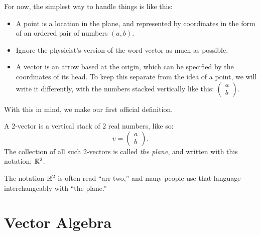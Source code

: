 \documentclass[00-livre-main.tex]{subfiles}
\begin{document}
For now, the simplest way to handle things is like this:
\begin{itemize}
\item A point is a location in the plane, and represented by coordinates in the form of an ordered pair of numbers $(a,b)$.
\item Ignore the physicist's version of the word vector as much as possible.
\item A vector is an arrow based at the origin, which can be specified by the coordinates of its head. To keep this separate from the idea of a point, we will write it differently, with the numbers stacked vertically like this: $\left(\begin{smallmatrix} a \\ b \end{smallmatrix}\right)$.
\end{itemize}
With this in mind, we make our first official definition.

\begin{definition} A $2$-vector is a vertical stack of $2$ real numbers, like so:
\[
v = \begin{pmatrix} a \\ b \end{pmatrix}.
\]
The collection of all such $2$-vectors is called \emph{the plane}, and written with this notation: $\mathbb{R}^2$.
\end{definition}

The notation $\mathbb{R}^2$ is often read ``arr-two,'' and many people use that language interchangeably with ``the plane.''

\section*{Vector Algebra}
\end{document}
